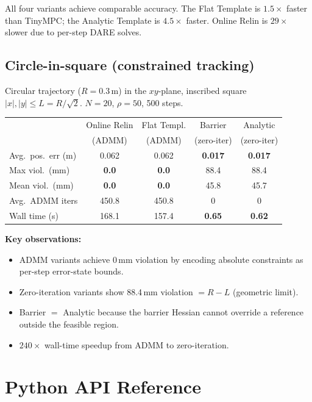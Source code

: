 \documentclass[11pt]{article}
\begin{document}
All four variants achieve comparable accuracy.
The Flat Template is $1.5\times$ faster than TinyMPC;
the Analytic Template is $4.5\times$ faster.
Online Relin is $29\times$ slower due to
per-step DARE solves.

\subsection{Circle-in-square (constrained tracking)}

Circular trajectory ($R = 0.3$\,m) in the $xy$-plane,
inscribed square $|x|, |y| \le L = R/\sqrt{2}$.
$N=20$, $\rho=50$, 500 steps.

\begin{center}
\renewcommand{\arraystretch}{1.2}
\begin{tabular}{@{}lcccc@{}}
\toprule
 & Online Relin & Flat Templ. & Barrier & Analytic \\
 & (ADMM) & (ADMM) & (zero-iter) & (zero-iter) \\
\midrule
Avg.\ pos.\ err (m) & 0.062 & 0.062 & \textbf{0.017} & \textbf{0.017} \\
Max viol.\ (mm)      & \textbf{0.0} & \textbf{0.0} & 88.4 & 88.4 \\
Mean viol.\ (mm)     & \textbf{0.0} & \textbf{0.0} & 45.8 & 45.7 \\
Avg.\ ADMM iters     & 450.8 & 450.8 & 0 & 0 \\
Wall time (s)        & 168.1 & 157.4 & \textbf{0.65} & \textbf{0.62} \\
\bottomrule
\end{tabular}
\end{center}

\textbf{Key observations:}
\begin{itemize}[leftmargin=6mm]
  \item ADMM variants achieve 0\,mm violation by encoding
    absolute constraints as per-step error-state bounds.
  \item Zero-iteration variants show 88.4\,mm violation
    $= R - L$ (geometric limit).
  \item Barrier $=$ Analytic because the barrier Hessian
    cannot override a reference outside the feasible region.
  \item $240\times$ wall-time speedup from ADMM to zero-iteration.
\end{itemize}

\section{Python API Reference}\label{sec:api}
\end{document}
